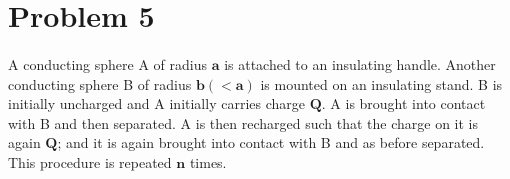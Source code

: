 \documentclass[]{article}
\begin{document}
{	\section*{Problem 5}

		\paragraph{} A conducting sphere A of radius $\bm{a}$ is attached to an insulating handle. Another conducting sphere B of radius $\bm{b} \left( < \bm{a} \right)$  is mounted on an insulating stand. B is initially uncharged and A initially carries charge $\bm{Q}$. A is brought into contact with B and then separated. A is then recharged such that the charge on it is again $\bm{Q}$; and it is again brought into contact with B and as before separated. This procedure is repeated $\bm{n}$ times.
		
}
\end{document}
